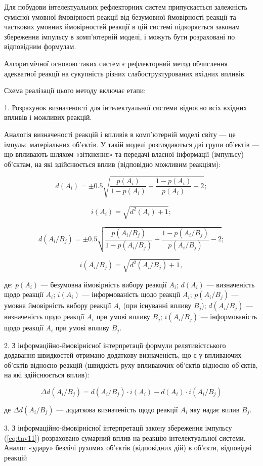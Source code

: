 Для побудови інтелектуальних рефлекторних систем припускається залежність сумісної умовної ймовірності реакції від безумовної ймовірності реакції та часткових умовних ймовірностей реакції в цій системі підкоряється законам збереження імпульсу в комп'ютерній моделі, і можуть бути розраховані по відповідним формулам.

Алгоритмічної основою таких систем є рефлекторний метод обчислення адекватної реакції на сукупність різних слабоструктурованих вхідних впливів.

Схема реалізації цього методу включає етапи:

1. Розрахунок визначеності для інтелектуальної системи відносно всіх вхідних впливів і можливих реакцій.

Аналогія визначеності реакцій і впливів в комп'ютерній моделі світу --- це імпульс матеріальних об'єктів. У такій моделі розглядаються дві групи об'єктів --- що впливають шляхом «зіткнення» та передачі власної інформації (імпульсу) об'єктам, на які здійснюється вплив (відповідно можливим реакціям):

\[
d(A_i)=\pm0.5\sqrt{\frac{p(A_i)}{1-p(A_i)}+\frac{1-p(A_i)}{p(A_i)}-2};
\]

\[
i(A_i)=\sqrt{d^2(A_i)+1};
\]

\[
d(A_i/B_j)=\pm0.5\sqrt{\frac{p(A_i/B_j)}{1-p(A_i/B_j)}+\frac{1-p(A_i/B_j)}{p(A_i/B_j)}-2};
\]

\[
i(A_i/B_j)=\sqrt{d^2(A_i/B_j)+1},
\]

\noindent
де: $p(A_i)$ --- безумовна ймовірність вибору реакції $A_i$; $d(A_i)$ --- визначеність щодо реакції $A_i$; $i(A_i)$ --- інформованість щодо реакції $A_i$; $p(A_i/B_j)$ --- умовна ймовірність вибору реакції $A_i$ (при існуванні впливу $B_j$); $d(A_i/B_j)$ --- визначеність щодо реакції $A_i$ при умові впливу $B_j$; $i(A_i/B_j)$ --- інформованість щодо реакції $A_i$ при умові впливу $B_j$.

2. З інформаційно-ймовірнісної інтерпретації формули релятивістського додавання швидкостей отримано додаткову визначеність, що є у впливаючих об'єктів відносно реакцій (швидкість руху впливаючих об'єктів відносно об'єктів, на які здійснюється вплив):

\[
\Delta d(A_i/B_j)=d(A_i/B_j)\cdot i(A_i)-d(A_i)\cdot i(A_i/B_j)
\]

\noindent
де $\Delta d(A_i/B_j)$ --- додаткова визначеність щодо реакції $A_i$ яку надає вплив $B_j$.

3. З інформаційно-ймовірнісної інтерпретації закону збереження імпульсу (\ref{eq:tnv11}) розраховано сумарний вплив на реакцію інтелектуальної системи. Аналог «удару» безлічі рухомих об'єктів (відповідних дій) в об'єкти, відповідні реакцій

